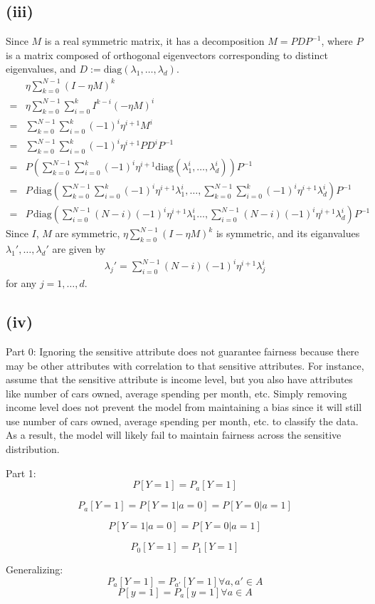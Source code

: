 \documentclass[twoside,11pt]{homework}
\begin{document}
\subsection*{(iii)}
	Since $M$ is a real symmetric matrix, it has a decomposition $M = P D P^{-1}$, 
	where $P$ is a matrix composed of orthogonal eigenvectors corresponding to distinct eigenvalues,
	and $D:= \text{diag}(\lambda_1,\dots, \lambda_d)$.
	\begin{align*}
		&\eta \sum_{k=0}^{N-1} (I-\eta M)^k \\
		=& \eta \sum_{k=0}^{N-1} \sum_{i=0}^{k} I^{k-i}(-\eta M)^i \\
		=&  \sum_{k=0}^{N-1} \sum_{i=0}^{k} (-1)^i\eta^{i+1} M^{i} \\
		=&  \sum_{k=0}^{N-1} \sum_{i=0}^{k} (-1)^i\eta^{i+1} PD^{i}P^{-1} \\
		=& P  \left(\sum_{k=0}^{N-1} \sum_{i=0}^{k}  (-1)^i\eta^{i+1}  \text{diag}(\lambda_1^i,\dots, \lambda_d^i) \right) P^{-1} \\
		=& P \, \text{diag} \left(\sum_{k=0}^{N-1} \sum_{i=0}^{k}  (-1)^i\eta^{i+1} \lambda_1^i,\dots, 
		\sum_{k=0}^{N-1} \sum_{i=0}^{k}  (-1)^i\eta^{i+1} \lambda_d^i \right)  P^{-1}\\
		=& P \, \text{diag} \left(
			\sum_{i=0}^{N-1} (N-i) (-1)^{i}\eta^{i+1}\lambda^i_1
			\dots, 
			\sum_{i=0}^{N-1} (N-i) (-1)^{i}\eta^{i+1}\lambda^i_d
		\right)  P^{-1}
	\end{align*}
	Since $I$, $M$ are symmetric, $\eta \sum_{k=0}^{N-1} (I-\eta M)^k$ is symmetric, 
	and its eiganvalues $\lambda_1',\dots, \lambda_d'$ are given by
	\begin{align*}
		\lambda_j' = \sum_{i=0}^{N-1} (N-i) (-1)^{i}\eta^{i+1}\lambda^i_j
	\end{align*}
	for any $j=1,\dots,d$.
\subsection*{(iv)}

Part 0:
Ignoring the sensitive attribute does not guarantee fairness because there may be
 other attributes with correlation to that sensitive attributes. For instance,
  assume that the sensitive attribute is income level, but you also have attributes like number of cars owned, average spending per month, etc. Simply removing income
   level does not prevent the model from maintaining a bias since it will still use
    number of cars owned, average spending per month, etc. to classify the data. As
     a result, the model will likely fail to maintain fairness across the sensitive distribution.

Part 1:
$$P[Y=1]=P_a[Y=1]$$ 

$$P_a[Y=1]=P[Y=1|a=0]=P[Y=0|a=1]$$

$$P[Y=1|a=0]=P[Y=0|a=1]$$

$$P_0[Y=1]=P_1[Y=1]$$

Generalizing:
$$P_{a}[Y=1] = P_{a'}[Y=1] \forall a, a ' \in A$$
$$P[y=1] = P_a[y=1] \forall a \in A$$\\
\end{document}
